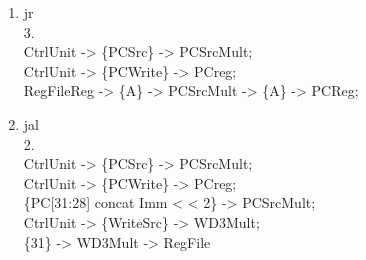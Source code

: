 \documentclass{article}
\begin{document}
\begin{enumerate}
\begin{enumerate}
\bigbreak

3 $\text{RegFileData}_\text{reg} \begin{matrix*}[l] \xrightarrow{\text{A}} \text{SrcA}_\text{multiplexer} \xrightarrow{\text{SrcA}} \\ \xrightarrow{\text{B}} \text{SrcB}_\text{multiplexer} \xrightarrow{\text{SrcB}} \end{matrix*} \text{ALU} \xrightarrow{\text{ALURes}} \text{ALUOut}_\text{reg}$, $\text{CtrlUnit} \begin{matrix*}[l] 
\xrightarrow{\text{ALUCtrl}} \text{ALU} \\ \xrightarrow{\text{ALUSrcA}} \text{SrcA}_\text{multiplexer} \\ \xrightarrow{\text{ALUSrcB}} \text{SrcB}_\text{multiplexer} \end{matrix*}$\\

\bigbreak

4 $\text{ALUOut}_\text{reg} \xrightarrow{\text{ALUOut}} \text{WD3}_\text{multiplexer} \xrightarrow{\text{ALUOut}} \text{WD3}_\text{RegFile}$,  $\text{CtrlUnit} \begin{matrix*}[l] 
\xrightarrow{\text{RegDst}} \text{RegDst}_\text{multiplexer} \\ \xrightarrow{\text{MemtoReg}} \text{WD3}_\text{multiplexer} \\ \xrightarrow{\text{RegWrite}} \text{RegFile} \end{matrix*}$\\

\bigbreak

    \item jr\\

3.\\
CtrlUnit -> \{PCSrc\} -> PCSrcMult;\\
CtrlUnit -> \{PCWrite\} -> PCreg;\\
RegFileReg -> \{A\} -> PCSrcMult -> \{A\} -> PCReg;\\

\bigbreak

    \item jal\\

2.\\
CtrlUnit -> \{PCSrc\} -> PCSrcMult;\\
CtrlUnit -> \{PCWrite\} -> PCreg;\\
\{PC[31:28] concat Imm < < 2\} -> PCSrcMult;\\
CtrlUnit -> \{WriteSrc\} -> WD3Mult;\\
\{31\} -> WD3Mult -> RegFile


\end{enumerate}
\end{enumerate}
\end{document}
